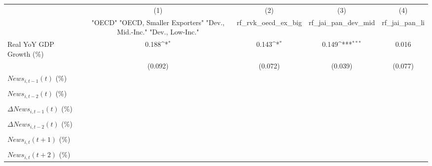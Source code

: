 {
\def\sym#1{\ifmmode^{#1}\else\(^{#1}\)\fi}
\begin{tabular}{l*{4}{c}}
\toprule
                    &\multicolumn{1}{c}{(1)}&\multicolumn{1}{c}{(2)}&\multicolumn{1}{c}{(3)}&\multicolumn{1}{c}{(4)}\\
                    &\multicolumn{1}{c}{ "OECD" "OECD, Smaller Exporters" "Dev., Mid.-Inc." "Dev., Low-Inc."}&\multicolumn{1}{c}{rf_rvk_oecd_ex_big}&\multicolumn{1}{c}{rf_jai_pan_dev_mid}&\multicolumn{1}{c}{rf_jai_pan_li}\\
\midrule
Real YoY GDP Growth (\%)&       0.188\sym{*}  &       0.143\sym{*}  &       0.149\sym{***}&       0.016         \\
                    &     (0.092)         &     (0.072)         &     (0.039)         &     (0.077)         \\
\addlinespace
$ News_{i,t-1}(t)$ (\%)&                     &                     &                     &                     \\
                    &                     &                     &                     &                     \\
\addlinespace
$ News_{i,t-2}(t)$ (\%)&                     &                     &                     &                     \\
                    &                     &                     &                     &                     \\
\addlinespace
$ \Delta News_{i,t-1}(t)$ (\%)&                     &                     &                     &                     \\
                    &                     &                     &                     &                     \\
\addlinespace
$ \Delta News_{i,t-2}(t)$ (\%)&                     &                     &                     &                     \\
                    &                     &                     &                     &                     \\
\addlinespace
$ News_{i,t}(t+1)$ (\%)&                     &                     &                     &                     \\
                    &                     &                     &                     &                     \\
\addlinespace
$ News_{i,t}(t+2)$ (\%)&                     &                     &                     &                     \\

\end{tabular}}
